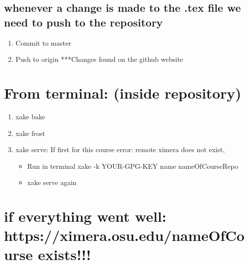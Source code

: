 \documentclass{ximera}
\begin{document}
\subsection{whenever a change is made to the .tex file we need to push to the repository}
\begin{enumerate}
\item Commit to master
\item Push to origin ***Changes found on the github website
\end{enumerate}

\section{From terminal: (inside repository)}
\begin{enumerate}
\item xake bake
\item	xake frost
\item	xake serve: If first for this course error: remote ximera does not exist,  
\begin{itemize}
\item Run in terminal xake -k YOUR-GPG-KEY name nameOfCourseRepo
\item xake serve again
\end{itemize}
\end{enumerate}

\section{if everything went well: https://ximera.osu.edu/nameOfCourse exists!!!}
\end{document}
